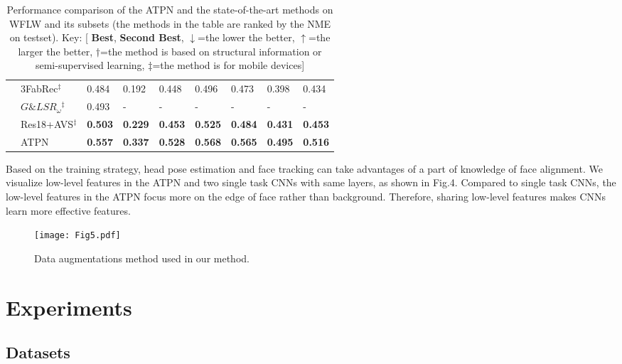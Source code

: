 \documentclass[3p,twocolumn, round, sort & compress]{elsarticle}
\begin{document}
\begin{table*}[t!]
\begin{tabular}{m{1.4cm}<{\centering}|m{3.8cm}<{\centering}|m{0.8cm}<{\centering}|m{0.7cm}<{\centering}|m{1.4cm}<{\centering}|m{1.5cm}<{\centering}|m{1.3cm}<{\centering}|m{1.2cm}<{\centering}|m{0.7cm}<{\centering}}
		& 3FabRec$^\ddag$ & 0.484   & 0.192 & 0.448      & 0.496        & 0.473   & 0.398     & 0.434 \\
		& $G\&LSR_\omega$$^\ddag$ & 0.493 & - & - & - & - & - & -\\
		& Res18+AVS$^\ddag$ & {\color{blue} \textbf{0.503}}   & {\color{blue} \textbf{0.229}} & {\color{blue} \textbf{0.453}}      & {\color{blue} \textbf{0.525}} & {\color{blue} \textbf{0.484}} & {\color{blue} \textbf{0.431}}     & {\color{blue} \textbf{0.453}} \\
		& ATPN & {\color{red} \textbf{0.557}} & {\color{red} \textbf{0.337}} & {\color{red} \textbf{0.528}} & {\color{red} \textbf{0.568}} & {\color{red} \textbf{0.565}} & {\color{red} \textbf{0.495}} & {\color{red} \textbf{0.516}} \\ \hline
	\end{tabular}
	\caption{Performance comparison of the ATPN and the state-of-the-art methods on WFLW and its subsets (the methods in the table are ranked by the NME on testset). Key: [{\color{red} \textbf{Best}}, {\color{blue} \textbf{Second Best}}, $\downarrow$=the lower the better, $\uparrow$=the larger the better, $\dag$=the method is based on structural information or semi-supervised learning, $\ddag$=the method is for mobile devices]}
	\label{Tabal1}
\end{table*}
Based on the training strategy, head pose estimation and face tracking can take advantages of a part of knowledge of face alignment. We visualize low-level features in the ATPN and two single task CNNs with same layers, as shown in Fig.4. Compared to single task CNNs, the low-level features in the ATPN focus more on the edge of face rather than background. Therefore, sharing low-level features makes CNNs learn more effective features.

\begin{figure}[t!]
	\centering
	\texttt{[image: Fig5.pdf]}
	\caption{Data augmentations method used in our method.}
	\label{fig5}
\end{figure}

\section{Experiments}

\subsection{Datasets} \label{sec:datasets}
\end{document}
